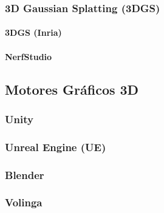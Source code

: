 \documentclass[a4paper, 12pt, spanish, twoside]{article}
\begin{document}
\subsubsection{3D Gaussian Splatting (3DGS)} \label{sec:herramientas:radfi:3dgs}

\paragraph{3DGS (Inria)} \label{sec:herramientas:radfi:3dgs:inria}

\paragraph{NerfStudio} \label{sec:herramientas:radfi:3dgs:nerfstudio}



\subsection{Motores Gráficos 3D} \label{sec:herramientas:motoresgraficos3d}

\subsubsection{Unity} \label{sec:herramientas:motoresgraficos3d:unity}


\subsubsection{Unreal Engine (UE)} \label{sec:herramientas:motoresgraficos3d:ue}


\subsubsection{Blender} \label{sec:herramientas:motoresgraficos3d:blender}


\subsubsection{Volinga} \label{sec:herramientas:motoresgraficos3d:volinga}
\end{document}
